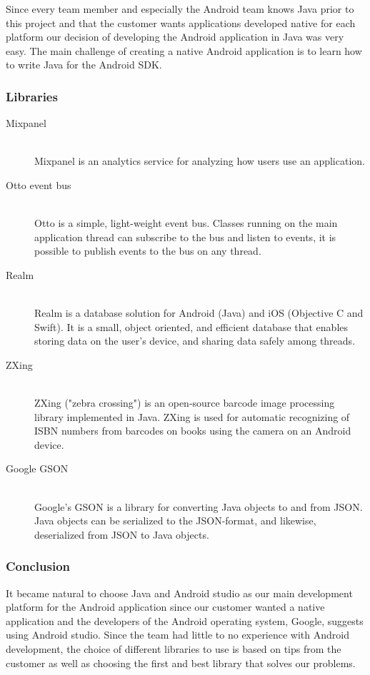 Since every team member and especially the Android team knows Java prior to this project and that the customer wants applications developed native for each platform our decision of developing the Android application in Java was very easy. The main challenge of creating a native Android application is to learn how to write Java for the Android \gls{SDK}. 

\subsubsection{Libraries}

\begin{description}
    \item[Mixpanel] \hfill \\
        Mixpanel is an analytics service for analyzing how users use an application.\cite{mixpanel}
    \item[Otto event bus] \hfill \\
        Otto is a simple, light-weight event bus. Classes running on the main application thread can subscribe to the bus and listen to events, it is possible to publish events to the bus on any thread.\cite{otto}
    \item[Realm] \hfill \\
        Realm is a database solution for Android (Java) and iOS (Objective C and Swift).\cite{realm} It is a small, object oriented, and efficient database that enables storing data on the user's device, and sharing data safely among threads.
    \item[ZXing] \hfill \\
        ZXing ("zebra crossing") is an open-source barcode image processing library implemented in Java.\cite{zxing} ZXing is used for automatic recognizing of ISBN numbers from barcodes on books using the camera on an Android device.  
    \item[Google GSON] \hfill \\
        Google's GSON is a library for converting Java objects to and from JSON. Java objects can be serialized to the JSON-format, and likewise, deserialized from JSON to Java objects.\cite{gson}
\end{description}

\subsubsection{Conclusion}
It became natural to choose Java and Android studio as our main development platform for the Android application since our customer wanted a native application and the developers of the Android operating system, Google, suggests using Android studio. Since the team had little to no experience with Android development, the choice of different libraries to use is based on tips from the customer as well as choosing the first and best library that solves our problems. 

